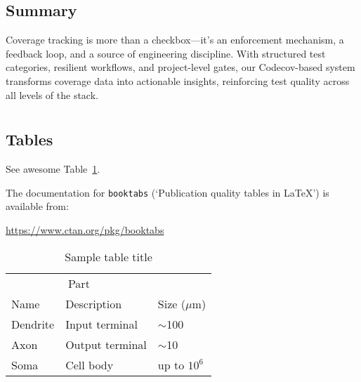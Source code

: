 \documentclass{article}
\begin{document}
\subsection{Summary}
\label{summary}

Coverage tracking is more than a checkbox---it's an enforcement mechanism, a
feedback loop, and a source of engineering discipline. With structured test
categories, resilient workflows, and project-level gates, our Codecov-based system
transforms coverage data into actionable insights, reinforcing test quality
across all levels of the stack.

  \section{}


  \subsection{Tables}
  See awesome Table~\ref{tab:table}.

  The documentation for \verb+booktabs+ (`Publication quality tables in LaTeX')
  is available from:
  \begin{center}
    \url{https://www.ctan.org/pkg/booktabs}
  \end{center}

  \begin{table}
    \caption{Sample table title}
    \centering
    \begin{tabular}{lll}
      \toprule \multicolumn{2}{c}{Part} \\
      \cmidrule(r){1-2} Name           & Description     & Size ($\mu$m)  \\
      \midrule Dendrite                & Input terminal  & $\sim$100      \\
      Axon                             & Output terminal & $\sim$10       \\
      Soma                             & Cell body       & up to $10^{6}$ \\
      \bottomrule
    \end{tabular}
    \label{tab:table}
  \end{table}

  
   
\end{document}

